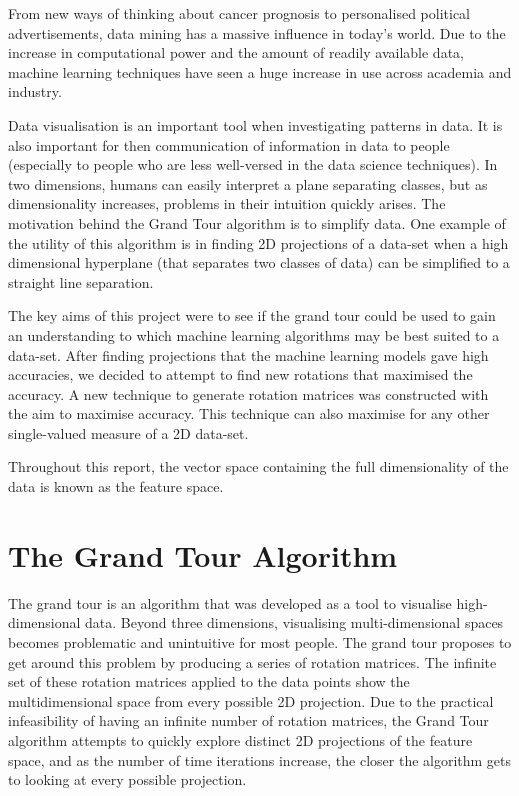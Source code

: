\documentclass[a4paper,11pt,twoside]{article}
\begin{document}
From new ways of thinking about cancer prognosis to personalised political advertisements, data mining has a massive influence in today’s world. Due to the increase in computational power and the amount of readily available data, machine learning techniques have seen a huge increase in use across academia and industry. 
\newline

Data visualisation is an important tool when investigating patterns in data. It is also important for then communication of information in data to people (especially to people who are less well-versed in the data science techniques). In two dimensions, humans can easily interpret a plane separating classes, but as dimensionality increases, problems in their intuition quickly arises. The motivation behind the Grand Tour algorithm is to simplify data. One example of the utility of this algorithm is in finding 2D projections of a data-set when a high dimensional hyperplane (that separates two classes of data) can be simplified to a straight line separation.
\newline

The key aims of this project were to see if the grand tour could be used to gain an understanding to which machine learning algorithms may be best suited to a data-set. After finding projections that the machine learning models gave high accuracies, we decided to attempt to find new rotations that maximised the accuracy. A new technique to generate rotation matrices was constructed with the aim to maximise accuracy. This technique can also maximise for any other single-valued measure of a 2D data-set.
\newline

Throughout this report, the vector space containing the full dimensionality of the data is known as the feature space.

\newpage
\section{The Grand Tour Algorithm}

The grand tour is an algorithm that was developed as a tool to visualise high-dimensional data. Beyond three dimensions, visualising multi-dimensional spaces becomes problematic and unintuitive for most people. The grand tour proposes to get around this problem by producing a series of rotation matrices. The infinite set of these rotation matrices applied to the data points show the multidimensional space from every possible 2D projection. Due to the practical infeasibility of having an infinite number of rotation matrices, the Grand Tour algorithm attempts to quickly explore distinct 2D projections of the feature space, and as the number of time iterations increase, the closer the algorithm gets to looking at every possible projection. 
\newline
\end{document}
